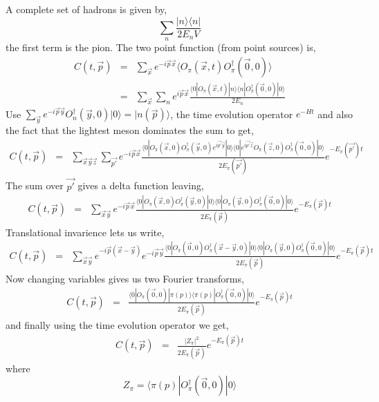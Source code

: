 \documentclass[3p,preprint]{elsarticle}
\begin{document}
A complete set of hadrons is given by,
\begin{equation}
	\sum_n \frac{ | n \rangle \langle n |}{ 2 E_n V}
\end{equation}
the first term is the pion. The two point function (from point sources) is,
\begin{eqnarray}
C(t, \vec{p}) &=& \sum_{\vec{x}} e^{-i \vec{p} \vec{x}} \langle O_\pi (\vec{x}, t) O^\dagger_\pi (\vec{0}, 0)\rangle \\
&=& \sum_{\vec{x}} \sum_n e^{i \vec{p} \vec{x}}
\frac{ \langle 0 | O_\pi (\vec{x}, t)  | n \rangle \langle n | O^\dagger_\pi (\vec{0}, 0)| 0 \rangle }{ 2 E_n }
\end{eqnarray}
Use $\sum_{ \vec{y} } e^{-i\vec{p} \vec{y}} O^\dagger_n (\vec{y}, 0) | 0 \rangle  = | n(\vec{p}) \rangle$, the time evolution
operator $e^{-Ht}$ and
also the fact that the lightest meson dominates the sum to get,
\begin{eqnarray}
C(t, \vec{p})
&=& \sum_{\vec{x} \vec{y} \vec{z}} \sum_{\vec{p'} } e^{-i \vec{p} \vec{x}}
\frac{ \langle 0 | O_\pi (\vec{x}, 0)  O^\dagger_\pi (\vec{y}, 0) e^{i \vec{p'} \vec{y} }   | 0 \rangle \langle 0 | e^{i \vec{p'} \vec{z} } O_\pi (\vec{z}, 0) O^\dagger_\pi (\vec{0}, 0)| 0 \rangle }{ 2 E_\pi(\vec{p'}) } e^{- E_\pi(\vec{p'}) t }
\end{eqnarray}
The sum over $\vec{p'}$ gives a delta function leaving,
\begin{eqnarray}
C(t, \vec{p})
&=& \sum_{\vec{x} \vec{y} } e^{-i \vec{p} \vec{x}}
\frac{ \langle 0 | O_\pi (\vec{x}, 0)  O^\dagger_\pi (\vec{y}, 0) | 0 \rangle \langle 0 | O_\pi (\vec{y}, 0) O^\dagger_\pi (\vec{0}, 0) | 0 \rangle }{ 2 E_\pi(\vec{p}) } e^{- E_\pi(\vec{p}) t }
\end{eqnarray}
Translational invarience lets us write,
\begin{eqnarray}
C(t, \vec{p})
&=& \sum_{\vec{x} \vec{y} } e^{-i \vec{p} ( \vec{x} - \vec{y} ) } e^{ -i \vec{p} \vec{y} }
\frac{ \langle 0 | O_\pi (\vec{0}, 0)  O^\dagger_\pi (\vec{x}-\vec{y}, 0) | 0 \rangle \langle 0 | O_\pi (\vec{y}, 0) O^\dagger_\pi (\vec{0}, 0)| 0 \rangle }{ 2 E_\pi(\vec{p}) } e^{- E_\pi(\vec{p}) t }
\end{eqnarray}
Now changing variables gives us two Fourier transforms,
\begin{eqnarray}
C(t, \vec{p})
&=&
\frac{ \langle 0 |  O_\pi (\vec{0}, 0) | \pi(p) \rangle \langle \pi(p) | O^\dagger_\pi (\vec{0}, 0)| 0 \rangle }{ 2 E_\pi(\vec{p}) } e^{- E_\pi(\vec{p}) t }
\end{eqnarray}
and finally using the time evolution operator we get,
\begin{eqnarray}
C(t, \vec{p})
&=&
\frac{ |Z_\pi|^2 }{ 2 E_\pi(\vec{p}) } e^{- E_\pi(\vec{p}) t }
\end{eqnarray}
where
\begin{equation}
Z_\pi = \langle \pi(p) | O^\dagger_\pi (\vec{0}, 0)| 0 \rangle
\end{equation}
\end{document}
